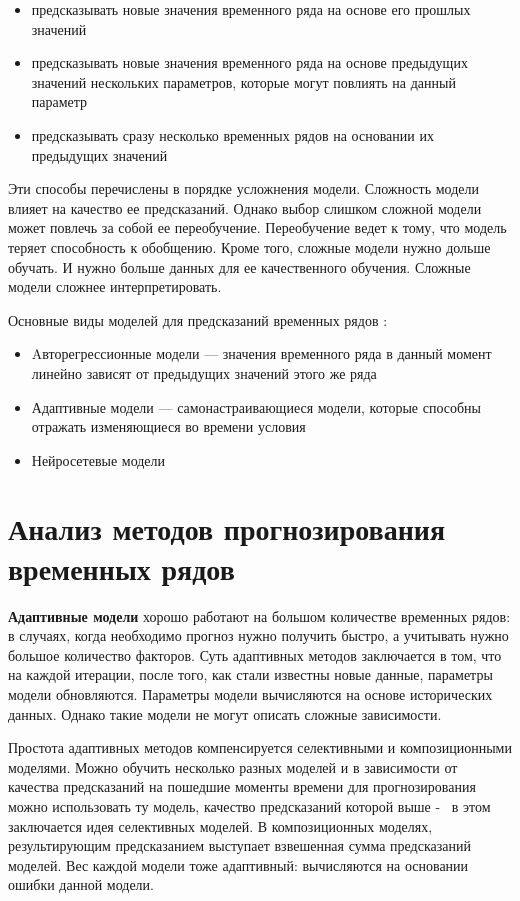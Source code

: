 \begin{itemize}
	\item предсказывать новые значения временного ряда на основе его прошлых значений
	\item предсказывать новые значения временного ряда на основе предыдущих значений
	нескольких параметров, которые могут повлиять на данный параметр
	\item предсказывать сразу несколько временных рядов на основании их предыдущих значений
\end{itemize}

Эти способы перечислены в порядке усложнения модели. Сложность модели влияет на
качество ее предсказаний. Однако выбор слишком сложной модели может повлечь
за собой ее переобучение. Переобучение ведет к тому, что модель теряет способность
к обобщению. Кроме того, сложные модели нужно дольше обучать. И нужно больше данных
для ее качественного обучения. Сложные модели сложнее интерпретировать.

Основные виды моделей для предсказаний временных рядов \cite{voron}:
\begin{itemize}
	\item Aвторегрессионные модели --- значения временного ряда в данный момент
	линейно зависят от предыдущих значений этого же ряда
	\item Адаптивные модели --- самонастраивающиеся модели,
	которые способны отражать изменяющиеся во времени условия
	\item Нейросетевые модели
\end{itemize}

\section{Анализ методов прогнозирования временных рядов}

\textbf{Адаптивные модели} хорошо работают на большом количестве временных рядов:
в случаях, когда необходимо прогноз нужно получить быстро, а учитывать
нужно большое количество факторов. Суть адаптивных
методов заключается в том, что на каждой итерации, после того, как стали
известны новые данные, параметры модели обновляются. Параметры модели вычисляются
на основе исторических данных. Однако такие модели не могут описать сложные
зависимости.

Простота адаптивных методов компенсируется селективными и композиционными моделями.
Можно обучить несколько разных моделей и в зависимости от качества предсказаний на пошедшие
моменты времени для прогнозирования можно использовать ту модель, качество предсказаний
которой выше -~ в этом заключается идея селективных моделей. В композиционных моделях,
результирующим предсказанием выступает взвешенная сумма предсказаний моделей. Вес каждой модели
тоже адаптивный: вычисляются на основании ошибки данной модели.


